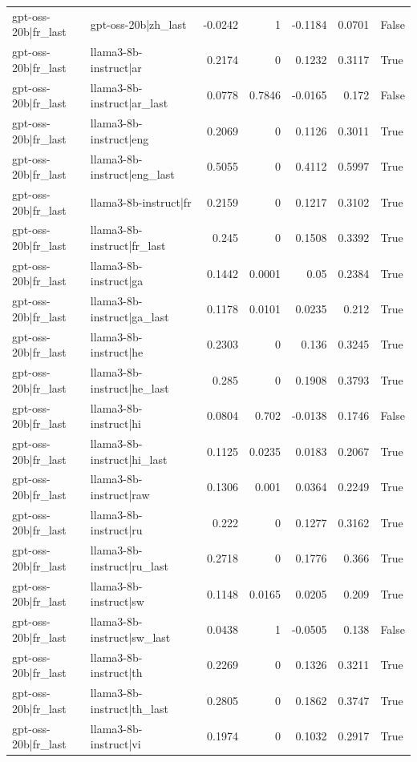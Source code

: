 \begin{table}
\begin{tabular}{l l r r r r l}
gpt-oss-20b|fr_last & gpt-oss-20b|zh_last & -0.0242 & 1 & -0.1184 & 0.0701 & False \\
gpt-oss-20b|fr_last & llama3-8b-instruct|ar & 0.2174 & 0 & 0.1232 & 0.3117 & True \\
gpt-oss-20b|fr_last & llama3-8b-instruct|ar_last & 0.0778 & 0.7846 & -0.0165 & 0.172 & False \\
gpt-oss-20b|fr_last & llama3-8b-instruct|eng & 0.2069 & 0 & 0.1126 & 0.3011 & True \\
gpt-oss-20b|fr_last & llama3-8b-instruct|eng_last & 0.5055 & 0 & 0.4112 & 0.5997 & True \\
gpt-oss-20b|fr_last & llama3-8b-instruct|fr & 0.2159 & 0 & 0.1217 & 0.3102 & True \\
gpt-oss-20b|fr_last & llama3-8b-instruct|fr_last & 0.245 & 0 & 0.1508 & 0.3392 & True \\
gpt-oss-20b|fr_last & llama3-8b-instruct|ga & 0.1442 & 0.0001 & 0.05 & 0.2384 & True \\
gpt-oss-20b|fr_last & llama3-8b-instruct|ga_last & 0.1178 & 0.0101 & 0.0235 & 0.212 & True \\
gpt-oss-20b|fr_last & llama3-8b-instruct|he & 0.2303 & 0 & 0.136 & 0.3245 & True \\
gpt-oss-20b|fr_last & llama3-8b-instruct|he_last & 0.285 & 0 & 0.1908 & 0.3793 & True \\
gpt-oss-20b|fr_last & llama3-8b-instruct|hi & 0.0804 & 0.702 & -0.0138 & 0.1746 & False \\
gpt-oss-20b|fr_last & llama3-8b-instruct|hi_last & 0.1125 & 0.0235 & 0.0183 & 0.2067 & True \\
gpt-oss-20b|fr_last & llama3-8b-instruct|raw & 0.1306 & 0.001 & 0.0364 & 0.2249 & True \\
gpt-oss-20b|fr_last & llama3-8b-instruct|ru & 0.222 & 0 & 0.1277 & 0.3162 & True \\
gpt-oss-20b|fr_last & llama3-8b-instruct|ru_last & 0.2718 & 0 & 0.1776 & 0.366 & True \\
gpt-oss-20b|fr_last & llama3-8b-instruct|sw & 0.1148 & 0.0165 & 0.0205 & 0.209 & True \\
gpt-oss-20b|fr_last & llama3-8b-instruct|sw_last & 0.0438 & 1 & -0.0505 & 0.138 & False \\
gpt-oss-20b|fr_last & llama3-8b-instruct|th & 0.2269 & 0 & 0.1326 & 0.3211 & True \\
gpt-oss-20b|fr_last & llama3-8b-instruct|th_last & 0.2805 & 0 & 0.1862 & 0.3747 & True \\
gpt-oss-20b|fr_last & llama3-8b-instruct|vi & 0.1974 & 0 & 0.1032 & 0.2917 & True \\

\end{tabular}
\end{table}
